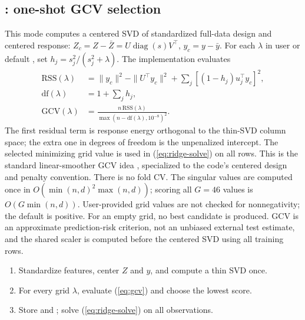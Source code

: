 \documentclass[conference]{IEEEtran}
\begin{document}
\subsection{: one-shot GCV selection}
This mode computes a centered SVD of standardized full-data design and centered response: \(Z_c=Z-\bar Z=U\operatorname{diag}(s)V^\top\), \(y_c=y-\bar y\). For each \(\lambda\) in user  or default , set \(h_j=s_j^2/(s_j^2+\lambda)\). The implementation evaluates
\begin{align}
\mathrm{RSS}(\lambda)&=\|y_c\|^2-\|U^\top y_c\|^2+\sum_j[(1-h_j)u_j^\top y_c]^2,\\
\mathrm{df}(\lambda)&=1+\sum_jh_j,\\
\mathrm{GCV}(\lambda)&=\frac{n\,\mathrm{RSS}(\lambda)}{\max(n-\mathrm{df}(\lambda),10^{-8})^2}.
\label{eq:gcv}
\end{align}
The first residual term is response energy orthogonal to the thin-SVD column space; the extra one in degrees of freedom is the unpenalized intercept. The selected minimizing grid value is used in (\ref{eq:ridge-solve}) on all rows. This is the standard linear-smoother GCV idea \cite{golub1979}, specialized to the code's centered design and penalty convention. There is no fold CV. The singular values are computed once in \(O(\min(n,d)^2\max(n,d))\); scoring all \(G=46\) values is \(O(G\min(n,d))\). User-provided grid values are not checked for nonnegativity; the default is positive. For an empty grid, no best candidate is produced. GCV is an approximate prediction-risk criterion, not an unbiased external test estimate, and the shared scaler is computed before the centered SVD using all training rows.
\begin{enumerate}
\item Standardize features, center \(Z\) and \(y\), and compute a thin SVD once.
\item For every grid \(\lambda\), evaluate (\ref{eq:gcv}) and choose the lowest score.
\item Store  and ; solve (\ref{eq:ridge-solve}) on all observations.
\end{enumerate}
\end{document}
